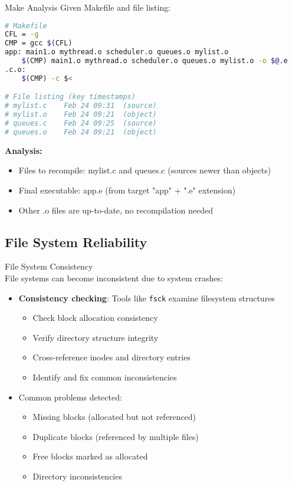 \begin{example2}{Make Analysis}
    Given Makefile and file listing:
    
\begin{lstlisting}[language=bash, style=basesmol]
# Makefile
CFL = -g
CMP = gcc $(CFL)
app: main1.o mythread.o scheduler.o queues.o mylist.o
    $(CMP) main1.o mythread.o scheduler.o queues.o mylist.o -o $@.e
.c.o:
    $(CMP) -c $<

# File listing (key timestamps)
# mylist.c    Feb 24 09:31  (source)
# mylist.o    Feb 24 09:21  (object)
# queues.c    Feb 24 09:25  (source)  
# queues.o    Feb 24 09:21  (object)
\end{lstlisting}

    \tcblower
    
    \textbf{Analysis:}
    \begin{itemize}
        \item Files to recompile: mylist.c and queues.c (sources newer than objects)
        \item Final executable: app.e (from target "app" + ".e" extension)
        \item Other .o files are up-to-date, no recompilation needed
    \end{itemize}
\end{example2}

\raggedcolumns
\columnbreak

\subsection{File System Reliability}

\begin{definition}{File System Consistency}\\
    File systems can become inconsistent due to system crashes:
    \begin{itemize}
        \item \textbf{Consistency checking}: Tools like \texttt{fsck} examine filesystem structures
            \begin{itemize}
                \item Check block allocation consistency
                \item Verify directory structure integrity
                \item Cross-reference inodes and directory entries
                \item Identify and fix common inconsistencies
            \end{itemize}
        \item Common problems detected:
            \begin{itemize}
                \item Missing blocks (allocated but not referenced)
                \item Duplicate blocks (referenced by multiple files)
                \item Free blocks marked as allocated
                \item Directory inconsistencies
            \end{itemize}
    \end{itemize}
\end{definition}

